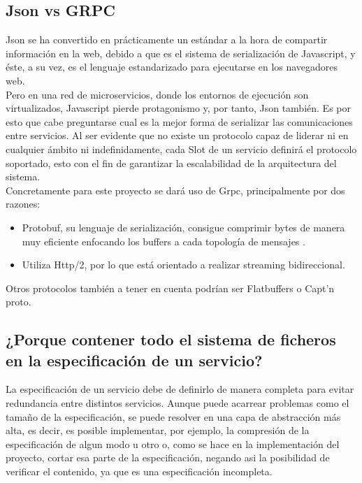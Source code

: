 \documentclass[11pt]{article}
\begin{document}
		\subsection{Json vs GRPC} 
			Json se ha convertido en prácticamente un estándar a la hora de compartir información en la web, debido a que es el sistema de serialización de Javascript, y éste, a su vez,
			es el lenguaje estandarizado para ejecutarse en los navegadores web. \\

			Pero en una red de microservicios, donde los entornos de ejecución son virtualizados, Javascript pierde protagonismo y, por tanto, Json también.
			Es por esto que cabe preguntarse cual es la mejor forma de serializar las comunicaciones entre servicios. Al ser evidente que no existe un protocolo capaz de
			liderar ni en cualquier ámbito ni indefinidamente, cada Slot de un servicio definirá el protocolo soportado, esto con el fin de garantizar la escalabilidad de la
			arquitectura del sistema. \\

			Concretamente para este proyecto se dará uso de Grpc, principalmente por dos razones:
			\begin{itemize}
				\item Protobuf, su lenguaje de serialización, consigue comprimir bytes de manera muy eficiente enfocando los buffers a cada topología de mensajes \cite{restvsgrpc}.
				\item Utiliza Http/2, por lo que está orientado a realizar streaming bidireccional.
			\end{itemize}
			Otros protocolos también a tener en cuenta podrían ser Flatbuffers \cite{flatbuffers} o Capt'n proto. \\
		
		\subsection{¿Porque contener todo el sistema de ficheros en la especificación de un servicio?}
			La especificación de un servicio debe de definirlo de manera completa para evitar redundancia entre distintos servicios.
			Aunque puede acarrear problemas como el tamaño de la especificación, se puede resolver en una capa de abstracción más alta, es decir,
			es posible implementar, por ejemplo, la compresión de la especificación de algun modo u otro o, como se hace en la implementación del 
			proyecto, cortar esa parte de la especificación, negando asi la posibilidad de verificar el contenido, ya que es una especificación
			incompleta. \\
\end{document}
